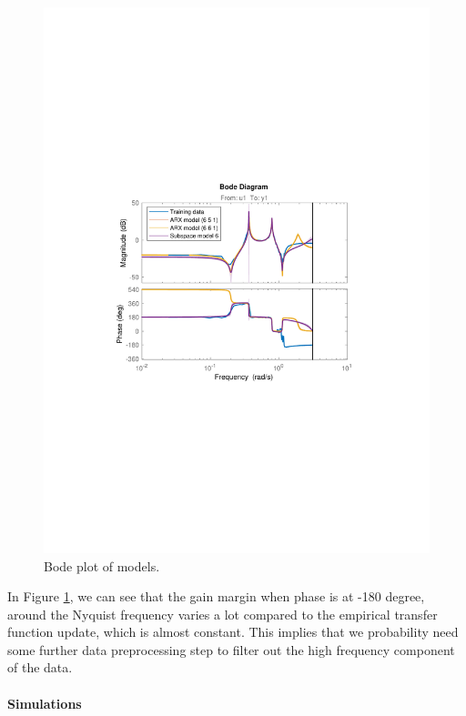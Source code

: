 \documentclass[]{article}
\begin{document}
\begin{figure}[ht]
\centering
\includegraphics[trim= 10cm 8cm 10cm 8cm, scale=0.7]{figures/bode_models.pdf}
\caption{Bode plot of models.}
\label{fig:bode_models}
\end{figure}
In Figure \ref{fig:bode_models}, we can see that the gain margin when phase is at -180 degree, around the Nyquist frequency varies a lot compared to the empirical transfer function update, which is almost constant. This implies that we probability need some further data preprocessing step to filter out the high frequency component of the data.


\paragraph{Simulations}
\end{document}
